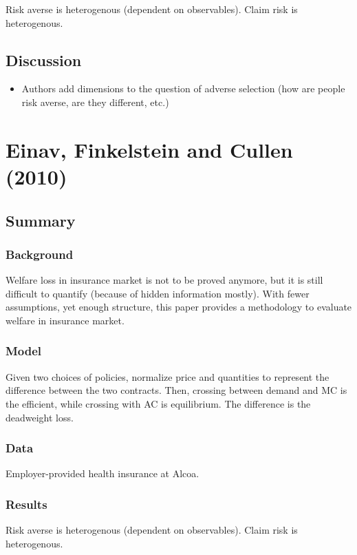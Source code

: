 Risk averse is heterogenous (dependent on observables). Claim risk is heterogenous.

\subsection{Discussion}

\begin{itemize}
\item Authors add dimensions to the question of adverse selection (how are people risk averse, are they different, etc.)
\end{itemize}

\section{Einav, Finkelstein and Cullen (2010)}

\subsection{Summary}

\subsubsection{Background}

Welfare loss in insurance market is not to be proved anymore, but it is still difficult to quantify (because of hidden information mostly). With fewer assumptions, yet enough structure, this paper provides a methodology to evaluate welfare in insurance market.

\subsubsection{Model}

Given two choices of policies, normalize price and quantities to represent the difference between the two contracts. Then, crossing between demand and MC is the efficient, while crossing with AC is equilibrium. The difference is the deadweight loss.

\subsubsection{Data}

Employer-provided health insurance at Alcoa.

\subsubsection{Results}

Risk averse is heterogenous (dependent on observables). Claim risk is heterogenous.
